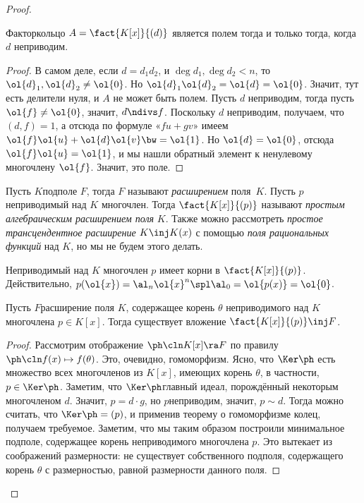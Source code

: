 \documentclass[a4paper]{article}
\newcommand{\kph}{\Ker \ph}
\begin{document}
\begin{proof}
\begin{theorem}
Факторкольцо $A=\fact{K[x]}{(d)}$ является полем тогда и только тогда, когда~$d$ неприводим.
\end{theorem}
\begin{proof}
В самом деле, если $d=d_1d_2$, и $\deg d_1, \deg d_2 < n$, то $\ol{d}_1, \ol{d}_2 \neq \ol{0}$. Но
$\ol{d}_1\ol{d}_2=\ol{d}=\ol{0}$. Значит, тут есть делители нуля, и $A$ не может быть полем. Пусть $d$
неприводим, тогда пусть $\ol{f} \neq \ol{0}$, значит, $d \ndivs f$.  Поскольку $d$ неприводим, получаем, что
$(d,f)=1$, а отсюда по формуле «$fu+gv$» имеем $\ol{f}\ol{u}+\ol{d}\ol{v} \bw=\ol{1}$. Но $\ol{d}=\ol{0}$, отсюда
$\ol{f}\ol{u}=\ol{1}$, и мы нашли обратный элемент к ненулевому многочлену $\ol{f}$. Значит, это поле.
\end{proof}

\begin{df}
Пусть $K$\т подполе $F$, тогда $F$ называют \emph{расширением} поля~$K$.
Пусть $p$\т неприводимый над $K$ многочлен. Тогда $\fact{K[x]}{(p)}$ называют \emph{простым
алгебраическим расширением поля} $K$. Также можно рассмотреть \emph{простое трансцендентное
расширение} $K \inj K(x)$ с помощью \emph{поля рациональных функций} над $K$, но мы не будем этого делать.
\end{df}

Неприводимый над $K$ многочлен $p$ имеет корни в $\fact{K[x]}{(p)}$. Действительно, $p(\ol{x})=
\al_n\ol{x}^n \spl \al_0=\ol{p(x)}=\ol{0}$.

\begin{theorem}[О вложении]
Пусть $F$\т расширение поля $K$, содержащее корень $\theta$ неприводимого над  $K$ многочлена $p \in K[x]$.
Тогда существует вложение $\fact{K[x]}{(p)} \inj F$.
\end{theorem}
\begin{proof}
Рассмотрим отображение $\ph\cln K[x] \ra F$ по правилу $\ph\cln f(x) \mapsto f(\theta)$.  Это, очевидно,
гомоморфизм. Ясно, что $\kph$ есть множество всех многочленов из $K[x]$, имеющих корень $\theta$, в
частности, $p \in \kph$. Заметим, что $\kph$\т главный идеал, порождённый некоторым многочленом $d$. Значит,
$p = d \cdot g$, но $p$\т неприводим, значит, $p \sim d$. Тогда можно считать, что $\kph = (p)$, и применив
теорему о гомоморфизме колец, получаем требуемое. Заметим, что мы таким образом построили минимальное
подполе, содержащее корень неприводимого многочлена $p$. Это вытекает из соображений размерности: не
существует собственного подполя, содержащего корень $\theta$ с размерностью, равной размерности данного поля.
\end{proof}


\end{proof}
\end{document}
